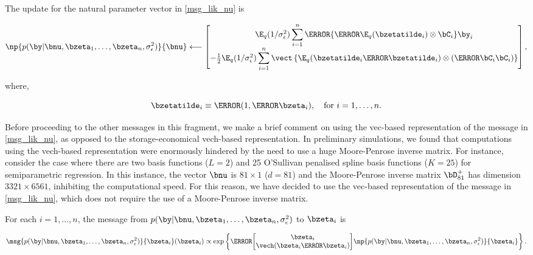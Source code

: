 \documentclass[12pt]{article}
\def\sigsqeps{\sigma^2_{\epsilon}}
\theoremstyle{plain}
\theoremstyle{definition}
\theoremstyle{remark}
\begin{document}
\noindent The update for the natural parameter vector in \eqref{msg_lik_nu} is

\begin{equation}
	\np{p (\by | \bnu, \bzeta_1, \dots, \bzeta_n, \sigsqeps)}{\bnu}
		\longleftarrow
			\begin{bmatrix}
				\E_q (1/\sigsqeps) \displaystyle\sum_{i=1}^n \T{\left\{
					\T{\E_q (\bzetatilde_i)} \otimes \bC_i
				\right\}} \by_i \\
				-\frac12 \E_q (1/\sigsqeps) \displaystyle\sum_{i=1}^n \vect \left\{
					\E_q (\bzetatilde_i \T{\bzetatilde_i}) \otimes (\T{\bC_i} \bC_i)
				\right\}
			\end{bmatrix},
\label{np_lik_nu}
\end{equation}

\noindent where, 

\begin{equation}
	\bzetatilde_i \equiv \T{(1, \T{\bzeta_i})}, \quad \text{for $i = 1, \dots, n$.}
\label{zeta_tilde}
\end{equation}

\noindent Before proceeding to the other messages in this fragment, we make a brief comment on using the vec-based
representation of the message in \eqref{msg_lik_nu}, as opposed to the storage-economical vech-based representation.
In preliminary simulations, we found that computations using the vech-based representation were enormously hindered
by the need to use a huge Moore-Penrose inverse matrix. For instance, consider the case where
there are two basis functions ($L = 2$) and 25 O'Sullivan penalised spline basis functions ($K = 25$) for semiparametric
regression. In this instance, the vector $\bnu$ is $81 \times 1$ ($d = 81$) and the Moore-Penrose inverse matrix
$\bD_{81}^+$ has dimension $3321 \times 6561$, inhibiting the computational speed. For this reason, we have
decided to use the vec-based representation of the message in \eqref{msg_lik_nu}, which does not require the
use of a Moore-Penrose inverse matrix.

For each $i = 1, \dots, n$, the message from $p (\by | \bnu, \bzeta_1, \dots, \bzeta_n, \sigsqeps)$ to $\bzeta_i$ is

\begin{equation}
	\msg{p (\by | \bnu, \bzeta_1, \dots, \bzeta_n, \sigsqeps)}{\bzeta_i} (\bzeta_i) \propto
		\exp \left\{
			\T{\begin{bmatrix}
				\bzeta_i \\
				\vech (\bzeta_i \T{\bzeta_i})
			\end{bmatrix}}
			\np{p (\by | \bnu, \bzeta_1, \dots, \bzeta_n, \sigsqeps)}{\bzeta_i}
		\right\}.
\label{msg_lik_zeta}
\end{equation}
\end{document}
